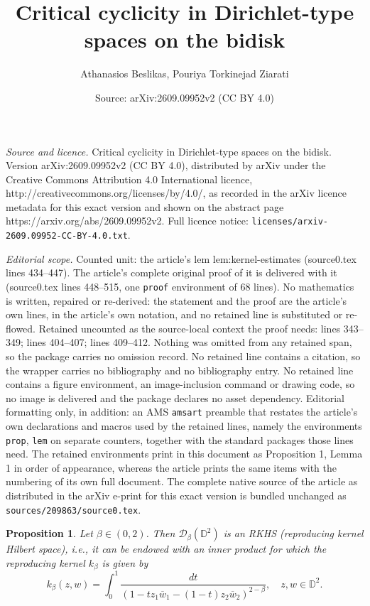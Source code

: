 \documentclass[10pt,a4paper]{amsart}
\title{Critical cyclicity in Dirichlet-type spaces on the bidisk}
\author{Athanasios Beslikas, Pouriya Torkinejad Ziarati}
\date{Source: arXiv:2609.09952v2 (CC BY 4.0)}
\newtheorem{prop}{Proposition}
\begin{document}
\maketitle

\noindent\emph{Source and licence.} Critical cyclicity in Dirichlet-type spaces on the bidisk. Version arXiv:2609.09952v2 (CC BY 4.0), distributed by arXiv under the Creative Commons Attribution 4.0 International licence, http://creativecommons.org/licenses/by/4.0/, as recorded in the arXiv licence metadata for this exact version and shown on the abstract page https://arxiv.org/abs/2609.09952v2. Full licence notice: \texttt{licenses/arxiv-2609.09952-CC-BY-4.0.txt}.\par\smallskip

\noindent\textit{Editorial scope.} Counted unit: the article's lem lem:kernel-estimates (source0.tex lines 434--447). The article's complete original proof of it is delivered with it (source0.tex lines 448--515, one \texttt{proof} environment of 68 lines). No mathematics is written, repaired or re-derived: the statement and the proof are the article's own lines, in the article's own notation, and no retained line is substituted or re-flowed.  Retained uncounted as the source-local context the proof needs: lines 343--349; lines 404--407; lines 409--412.  Nothing was omitted from any retained span, so the package carries no omission record.  No retained line contains a citation, so the wrapper carries no bibliography and no bibliography entry.  No retained line contains a figure environment, an image-inclusion command or drawing code, so no image is delivered and the package declares no asset dependency.  Editorial formatting only, in addition: an AMS \texttt{amsart} preamble that restates the article's own declarations and macros used by the retained lines, namely the environments \texttt{prop}, \texttt{lem} on separate counters, together with the standard packages those lines need.  The retained environments print in this document as Proposition 1, Lemma 1 in order of appearance, whereas the article prints the same items with the numbering of its own full document.  The complete native source of the article as distributed in the arXiv e-print for this exact version is bundled unchanged as \texttt{sources/209863/source0.tex}.
\begin{prop} \label{prop: kernel}
Let $\beta \in (0,2)$. Then $\mathcal D_\beta(\mathbb{D}^2)$ is an RKHS (reproducing kernel Hilbert space), i.e., it can be endowed with an inner product for which the reproducing kernel $k_\beta$ is given by
\begin{equation*}
    k_{\beta}(z,w) = \int_0^1 \frac{dt}{\left(1 - t z_1 \overline{w}_1 - (1-t) z_2 \overline{w}_2 \right)^{2-\beta}}, 
    \quad z,w \in \mathbb{D}^2.
\end{equation*}
\end{prop}
\end{document}
